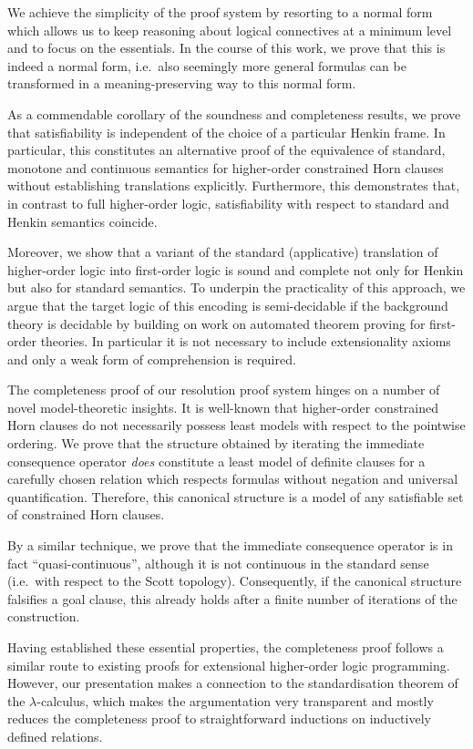 \documentclass[a4paper,twoside,notitlepage,openright,11pt]{report}
\begin{document}
We achieve the simplicity of the proof system by resorting to a normal form which allows us to keep reasoning about logical connectives at a minimum level and to focus on the essentials. In the course of this work, we prove that this is indeed a normal form, i.e.\ also seemingly more general formulas can be transformed in a meaning-preserving way to this normal form.

As a commendable corollary of the soundness and completeness results, we prove that satisfiability is independent of the choice of a particular Henkin frame.
In particular, this constitutes an alternative proof of the equivalence of standard, monotone and continuous semantics for higher-order constrained Horn clauses without establishing translations explicitly.
Furthermore, this demonstrates that, in contrast to full higher-order logic, satisfiability with respect to standard and Henkin semantics coincide.

Moreover, we show that a variant of the standard (applicative) translation of higher-order logic into first-order logic is sound and complete not only for Henkin but also for standard semantics. To underpin the practicality of this approach, we argue that the target logic of this encoding is semi-decidable if the background theory is decidable by building on work on automated theorem proving for first-order theories. In particular it is not necessary to include extensionality axioms and only a weak form of comprehension is required.

The completeness proof of our resolution proof system hinges on a number of novel model-theoretic insights. It is well-known that higher-order constrained Horn clauses do not necessarily possess least models with respect to the pointwise ordering. We prove that the structure obtained by iterating the immediate consequence operator \emph{does} constitute a least model of definite clauses for a carefully chosen relation which respects formulas without negation and universal quantification. Therefore, this canonical structure is a model of any satisfiable set of constrained Horn clauses.

By a similar technique, we prove that the immediate consequence operator is in fact ``quasi-continuous'', although it is not continuous in the standard sense (i.e.~with respect to the Scott topology).
Consequently, if the canonical structure falsifies a goal clause, this already holds after a finite number of iterations of the construction.

Having established these essential properties, the completeness proof follows a similar route to existing proofs for extensional higher-order logic programming. However, our presentation makes a connection to the standardisation theorem of the $\lambda$-calculus, which makes the argumentation very transparent and mostly reduces the completeness proof to straightforward inductions on inductively defined relations.
\end{document}
